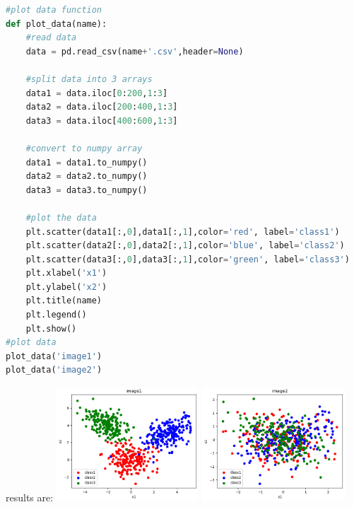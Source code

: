 \documentclass[12pt]{article}
\begin{document}
\begin{qsolve}
    \begin{lstlisting}[language=Python,caption={Simulation Question 1.},label={code:Simulation Question 1.}]
#plot data function
def plot_data(name):
    #read data
    data = pd.read_csv(name+'.csv',header=None)

    #split data into 3 arrays
    data1 = data.iloc[0:200,1:3]
    data2 = data.iloc[200:400,1:3]
    data3 = data.iloc[400:600,1:3]

    #convert to numpy array
    data1 = data1.to_numpy()
    data2 = data2.to_numpy()
    data3 = data3.to_numpy()

    #plot the data
    plt.scatter(data1[:,0],data1[:,1],color='red', label='class1')
    plt.scatter(data2[:,0],data2[:,1],color='blue', label='class2')
    plt.scatter(data3[:,0],data3[:,1],color='green', label='class3')
    plt.xlabel('x1')
    plt.ylabel('x2')
    plt.title(name)
    plt.legend()
    plt.show()
#plot data
plot_data('image1')
plot_data('image2')
        \end{lstlisting}

    \splitqsolve
    results are:
    \tcblower
    \centering
    \includegraphics[width=0.4\textwidth]{outputs/output1.png}
    \label{fig:fig1}
    \includegraphics[width=0.4\textwidth]{outputs/output2.png}
    \label{fig:fig2}
\end{qsolve}
\end{document}
